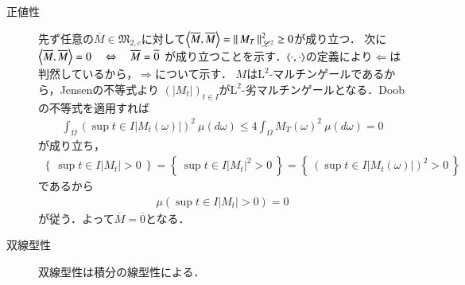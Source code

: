 \begin{prf}
\begin{description}
			\item[正値性]
				先ず任意の$\overline{M} \in \mathfrak{M}_{2,c}$に対して$\inprod<\overline{M},\overline{M}> = \Norm{M_T}{\mathscr{L}^2}^2 \geq 0$が成り立つ．
				次に$\inprod<\overline{M},\overline{M}> = 0 \quad \Leftrightarrow \quad \overline{M} = \overline{0}$
				が成り立つことを示す．$\inprod<\cdot,\cdot>$の定義により$\Leftarrow$は判然しているから，$\Rightarrow$について示す．
				$M$は$\mathrm{L}^2$-マルチンゲールであるから，Jensenの不等式より
				$(|M_t|)_{t \in I}$が$\mathrm{L}^2$-劣マルチンゲールとなる．Doobの不等式を適用すれば
				\begin{align}
					\int_{\Omega} \left( \sup{t \in I}{|M_t(\omega)|} \right)^2\ \mu(d\omega) \leq 4 \int_{\Omega} {M_T(\omega)}^2\ \mu(d\omega) = 0
				\end{align}
				が成り立ち，
				\begin{align}
					\left\{\ \sup{t \in I}{|M_t|} > 0\ \right\} = \left\{\ \sup{t \in I}{|M_t|^2} > 0\ \right\} = \left\{\ \left(\sup{t \in I}{|M_t(\omega)|}\right)^2 > 0\ \right\}
				\end{align}
				であるから
				\begin{align}
					\mu\left( \sup{t \in I}{|M_t|} > 0 \right) = 0
				\end{align}
				が従う．よって$\overline{M} = \overline{0}$となる．
	
			\item[双線型性]
				双線型性は積分の線型性による．
			\end{description}
		\QED
	\end{prf}
		
